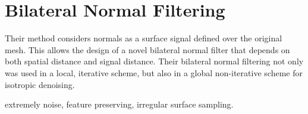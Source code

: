 \section{Bilateral Normal Filtering}
Their method considers normals as a surface signal defined over the original mesh.
This allows the design of a novel bilateral normal filter that depends on both spatial distance and signal distance.
Their bilateral normal filtering not only was used in a local, iterative scheme, but also in a global non-iterative scheme for isotropic denoising.

extremely noise,  feature preserving, irregular surface sampling.